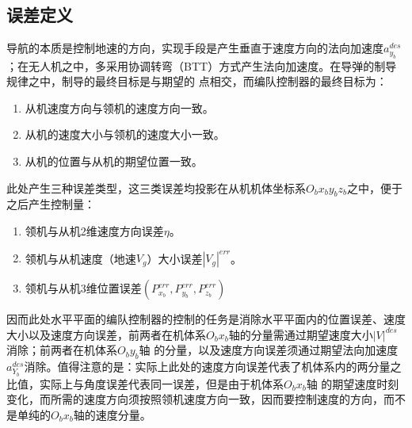 \subsection{误差定义}
导航的本质是控制地速的方向，实现手段是产生垂直于速度方向的法向加速度$a_{y_b}^{des}$；在无人机之中，多采用协调转弯（BTT）方式产生法向加速度。在导弹的制导规律之中，制导的最终目标是与期望的
点相交，而编队控制器的最终目标为：
\begin{enumerate}
    \item 从机速度方向与领机的速度方向一致。
    \item 从机的速度大小与领机的速度大小一致。
    \item 从机的位置与从机的期望位置一致。
\end{enumerate}
此处产生三种误差类型，这三类误差均投影在从机机体坐标系$O_bx_by_bz_b$之中，便于之后产生控制量：
\begin{enumerate}
    \item 领机与从机2维速度方向误差$\eta$。%
    \item 领机与从机速度（地速$V_g$）大小误差$|V_g|^{err}$。
    \item 领机与从机3维位置误差$(P_{x_b}^{err},P_{y_b}^{err},P_{z_b}^{err})$
\end{enumerate}
因而此处水平平面的编队控制器的控制的任务是消除水平平面内的位置误差、速度大小以及速度方向误差，前两者在机体系$O_bx_b$轴的分量需通过期望速度大小${|V|}^{des}$消除；前两者在机体系$O_by_b$轴
的分量，以及速度方向误差须通过期望法向加速度$a_{Y_b}^{des}$消除。值得注意的是：实际上此处的速度方向误差代表了机体系内的两分量之比值，实际上与角度误差代表同一误差，但是由于机体系$O_bx_b$轴
的期望速度时刻变化，而所需的速度方向须按照领机速度方向一致，因而要控制速度的方向，而不是单纯的$O_bx_b$轴的速度分量。
